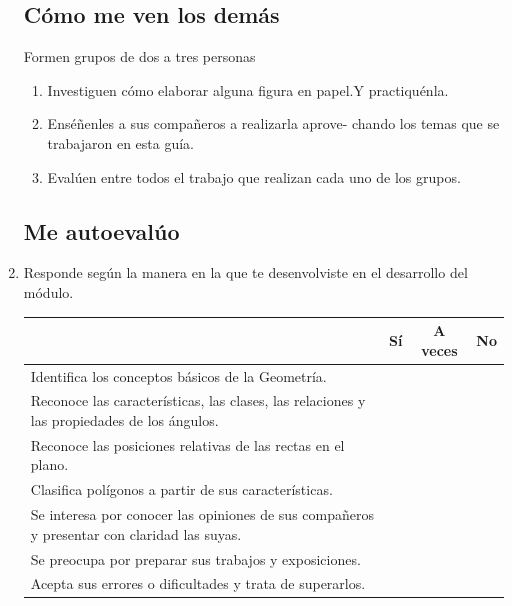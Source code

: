 \documentclass[10pt,twoside]{article}
\begin{document}
\begin{enumerate}
\subsection{Cómo me ven los demás}
Formen grupos de dos a tres personas
\begin{enumerate}
\item Investiguen cómo elaborar alguna figura en papel.Y
practiquénla.
\item Enséñenles a sus compañeros a realizarla aprove-
chando los temas que se trabajaron en esta guía.
\item Evalúen entre todos el trabajo que realizan cada uno
de los grupos.
\end{enumerate}
\subsection{Me autoeval\'{u}o}
\item Responde según la manera en la que te desenvolviste en
el desarrollo del módulo.
\begin{tabular}{|l|c|c|c|}
\hline 
 & Sí & A veces & No \\ 
\hline 
Identifica los conceptos básicos de la
Geometría. &  &  &  \\ 
\hline 
Reconoce las características, las clases, las
relaciones y las propiedades de los ángulos. &  &  &  \\ 
\hline 
Reconoce las posiciones relativas de las rectas
en el plano. &  &  &  \\ 
\hline 
Clasifica polígonos a partir de sus
características. &  &  &  \\ 
\hline 
Se interesa por conocer las opiniones de sus
compañeros y presentar con claridad las suyas. &  &  &  \\ 
\hline 
Se preocupa por preparar sus trabajos y
exposiciones. &  &  &  \\ 
\hline 
Acepta sus errores o dificultades y trata de
superarlos. &  &  &  \\ 
\hline 
\end{tabular} 
\end{enumerate}
\end{document}
